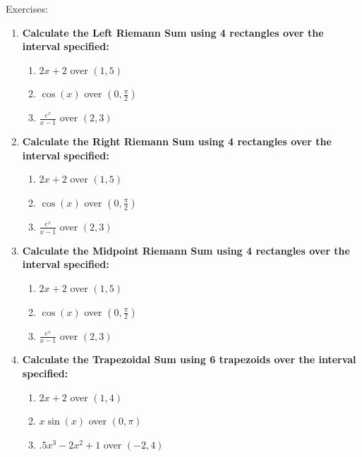 \documentclass[../revisedmain.tex]{subfiles}
\begin{document}
\begin{center}
\LARGE Exercises:
\end{center}
\begin{enumerate}
	\item \textbf{Calculate the Left Riemann Sum using 4 rectangles over the interval specified:}
	\begin{enumerate}
		\item $2x+2$ over $(1,5)$
		\item $\cos(x)$ over $(0,\frac{\pi}{2})$
		\item $\frac{e^x}{x-1}$ over $(2,3)$
	\end{enumerate}
	\item \textbf{Calculate the Right Riemann Sum using 4 rectangles over the interval specified:}
	\begin{enumerate}
		\item $2x+2$ over $(1,5)$
		\item $\cos(x)$ over $(0,\frac{\pi}{2})$
		\item $\frac{e^x}{x-1}$ over $(2,3)$
	\end{enumerate}
	\item \textbf{Calculate the Midpoint Riemann Sum using 4 rectangles over the interval specified:}
	\begin{enumerate}
		\item $2x+2$ over $(1,5)$
		\item $\cos(x)$ over $(0,\frac{\pi}{2})$
		\item $\frac{e^x}{x-1}$ over $(2,3)$
	\end{enumerate}
	\item \textbf{Calculate the Trapezoidal Sum using 6 trapezoids over the interval specified:}
	\begin{enumerate}
		\item $2x+2$ over $(1,4)$
		\item $x\sin(x)$ over $(0,\pi)$
		\item $.5x^3-2x^2+1$ over $(-2,4)$
	\end{enumerate}
\end{enumerate}
\end{document}
